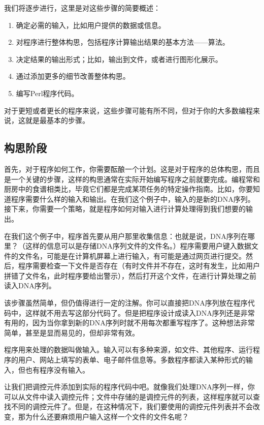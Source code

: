 我们将逐步进行，这里是对这些步骤的简要概述：

\begin{enumerate}
  \item 确定必需的输入，比如用户提供的数据或信息。
  \item 对程序进行整体构思，包括程序计算输出结果的基本方法——算法。
  \item 决定结果的输出形式；比如，输出到文件，或者进行图形化展示。
  \item 通过添加更多的细节改善整体构思。
  \item 编写Perl程序代码。
\end{enumerate}

对于更短或者更长的程序来说，这些步骤可能有所不同，但对于你的大多数编程来说，这就是最基本的步骤。

\subsection{构思阶段}
首先，对于程序如何工作，你需要酝酿一个计划。这是对于程序的总体构思，而且是一个关键的步骤，这样的构思通常在实际开始编写程序之前就要完成。编程常和厨房中的食谱相类比，毕竟它们都是完成某项任务的特定操作指南。比如，你要知道程序需要什么样的输入和输出。在我们这个例子中，输入的是新的DNA序列。接下来，你需要一个策略，就是程序如何对输入进行计算处理得到我们想要的输出。

在我们这个例子中，程序首先要从用户那里收集信息：也就是说，DNA序列在哪里？（这样的信息可以是存储DNA序列文件的文件名。）程序需要用户键入数据文件的文件名，可能是在计算机屏幕上进行输入，有可能是通过网页进行提交。然后，程序需要检查一下文件是否存在（有时文件并不存在，这时有发生，比如用户拼错了文件名，此时程序要给出警示），然后打开这个文件，在进行计算处理之前读入DNA序列。

该步骤虽然简单，但仍值得进行一定的注解。你可以直接把DNA序列放在程序代码中，这样就不用去写这部分代码了。但是把程序设计成读入DNA序列还是非常有用的，因为当你拿到新的DNA序列时就不用每次都重写程序了。这种想法非常简单，甚至是显而易见的，但却非常有效。

程序用来处理的数据叫做输入。输入可以有多种来源，如文件、其他程序、运行程序的用户、网站上填写的表单、电子邮件信息等。多数程序都读入某种形式的输入，但也有程序没有输入。

让我们把调控元件添加到实际的程序代码中吧。就像我们处理DNA序列一样，你可以从文件中读入调控元件；文件中存储的是调控元件的列表，这样程序就可以查找不同的调控元件了。但是，在这种情况下，我们要使用的调控元件列表并不会改变，那为什么还要麻烦用户输入这样一个文件的文件名呢？

